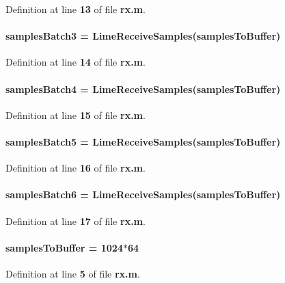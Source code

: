 Definition at line {\bf 13} of file {\bf rx.\+m}.

\paragraph[{samples\+Batch3}]{\setlength{\rightskip}{0pt plus 5cm}samples\+Batch3 = Lime\+Receive\+Samples({\bf samples\+To\+Buffer})}\label{rx_8m_ab15dc3dbacf82be72d457d6169efecfb}


Definition at line {\bf 14} of file {\bf rx.\+m}.

\paragraph[{samples\+Batch4}]{\setlength{\rightskip}{0pt plus 5cm}samples\+Batch4 = Lime\+Receive\+Samples({\bf samples\+To\+Buffer})}\label{rx_8m_a739544559e0b04d2fc5c7e546b75bb0b}


Definition at line {\bf 15} of file {\bf rx.\+m}.

\paragraph[{samples\+Batch5}]{\setlength{\rightskip}{0pt plus 5cm}samples\+Batch5 = Lime\+Receive\+Samples({\bf samples\+To\+Buffer})}\label{rx_8m_a08944b7c94c99a5de15497b1ff0e3b26}


Definition at line {\bf 16} of file {\bf rx.\+m}.

\paragraph[{samples\+Batch6}]{\setlength{\rightskip}{0pt plus 5cm}samples\+Batch6 = Lime\+Receive\+Samples({\bf samples\+To\+Buffer})}\label{rx_8m_af80c4982bb3e21f53e23aec35cf62d32}


Definition at line {\bf 17} of file {\bf rx.\+m}.

\paragraph[{samples\+To\+Buffer}]{\setlength{\rightskip}{0pt plus 5cm}samples\+To\+Buffer = 1024$\ast$64}\label{rx_8m_aef62e6be40f7ee3ec37d427c7e59b2a8}


Definition at line {\bf 5} of file {\bf rx.\+m}.


